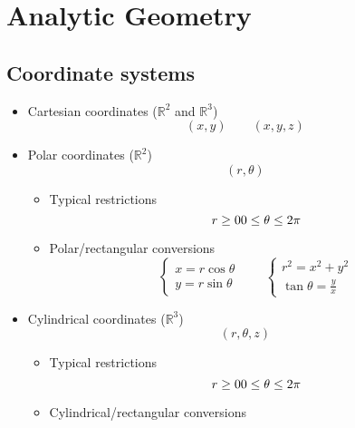 \section{Analytic Geometry}

\subsection{Coordinate systems}
	\begin{itemize}
		\item Cartesian coordinates ($\mathbb{R}^2$ and $\mathbb{R}^3$)
			\begin{equation}
				(x,y) \qquad (x,y,z)
			\end{equation}
		\item Polar coordinates ($\mathbb{R}^2$)
			\begin{equation}
				(r, \theta)
			\end{equation}
			\begin{itemize}
				\item Typical restrictions
					\begin{equation}
						r \geq 0 \\
						0 \leq \theta \leq 2 \pi
					\end{equation}
				\item Polar/rectangular conversions
					\begin{equation}
						\begin{cases}
							x = r \cos \theta \\
							y = r \sin \theta
						\end{cases} \qquad \begin{cases}
							r^2 = x^2 + y^2 \\
							\tan \theta = \frac{y}{x}
						\end{cases}
					\end{equation}
			\end{itemize}
		\item Cylindrical coordinates ($\mathbb{R}^3$)
			\begin{equation}
				(r, \theta, z)
			\end{equation}
			\begin{itemize}
				\item Typical restrictions
					\begin{equation}
						r \geq 0 \\
						0 \leq \theta \leq 2 \pi
					\end{equation}
				\item Cylindrical/rectangular conversions

\end{itemize}
\end{itemize}
